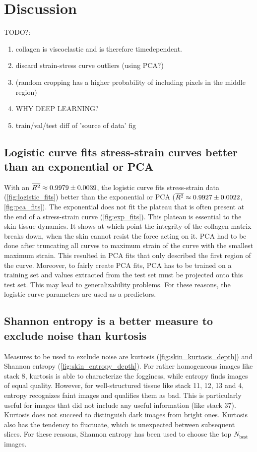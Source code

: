 \section{Discussion}

TODO?:
\begin{enumerate}
    \item collagen is viscoelastic and is therefore timedependent.
    \item discard strain-stress curve outliers (using PCA?)
    \item (random cropping has a higher probability of including pixels in the middle region)
    \item WHY DEEP LEARNING?
    \item train/val/test diff of 'source of data' fig
\end{enumerate}

\subsection{Logistic curve fits stress-strain curves better than an exponential or PCA}
With an $\overline{R^2} \approx \num{0.9979 \pm 0.0039}$, the logistic curve fits stress-strain data (\cref{fig:logistic_fits}) better than the exponential or PCA ($\overline{R^2} \approx \num{0.9927 \pm 0.0022}$, \cref{fig:pca_fits}).
The exponential does not fit the plateau that is often present at the end of a stress-strain curve (\cref{fig:exp_fits}).
This plateau is essential to the skin tissue dynamics.
It shows at which point the integrity of the collagen matrix breaks down, \ie when the skin cannot resist the force acting on it.
PCA had to be done after truncating all curves to maximum strain of the curve with the smallest maximum strain.
This resulted in PCA fits that only described the first region of the curve.
Moreover, to fairly create PCA fits, PCA has to be trained on a training set and values extracted from the test set must be projected onto this test set.
This may lead to generalizability problems.
For these reasons, the logistic curve parameters are used as a predictors.

\subsection{Shannon entropy is a better measure to exclude noise than kurtosis}\label{sec:disc_ent_vs_kur}
Measures to be used to exclude noise are kurtosis (\cref{fig:skin_kurtosis_depth}) and Shannon entropy (\cref{fig:skin_entropy_depth}).
For rather homogeneous images like stack 8, kurtosis is able to characterize the fogginess, while entropy finds images of equal quality.
However, for well-structured tissue like stack 11, 12, 13 and 4, entropy recognizes faint images and qualifies them as bad.
This is particularly useful for images that did not include any useful information (like stack 37).
Kurtosis does not succeed to distinguish dark images from bright ones.
Kurtosis also has the tendency to fluctuate, which is unexpected between subsequent slices.
For these reasons, Shannon entropy has been used to choose the top $N_\mathrm{best}$ images.

